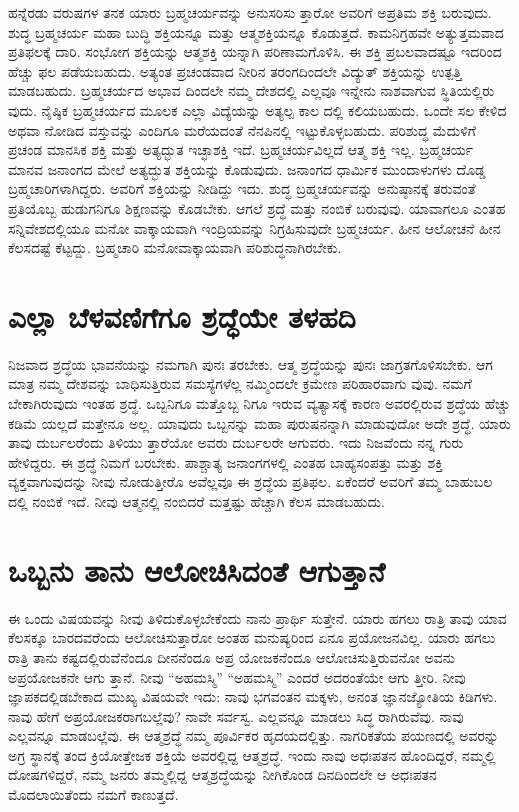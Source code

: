 ಹನ್ನೆರಡು ವರುಷಗಳ ತನಕ ಯಾರು ಬ್ರಹ್ಮಚರ್ಯವನ್ನು ಅನುಸರಿಸು ತ್ತಾರೋ ಅವರಿಗೆ ಅಪ್ರತಿಮ ಶಕ್ತಿ ಬರುವುದು. ಶುದ್ಧ ಬ್ರಹ್ಮಚರ್ಯ ಮಹಾ ಬುದ್ಧಿ ಶಕ್ತಿಯನ್ನೂ ಮತ್ತು ಆತ್ಮಶಕ್ತಿಯನ್ನೂ ಕೊಡುತ್ತದೆ. ಕಾಮನಿಗ್ರಹವೇ ಅತ್ಯುತ್ತಮವಾದ ಪ್ರತಿಫಲಕ್ಕೆ ದಾರಿ. ಸಂಭೋಗ ಶಕ್ತಿಯನ್ನು ಆತ್ಮಶಕ್ತಿ ಯನ್ನಾಗಿ ಪರಿಣಾಮಗೊಳಿಸಿ. ಈ ಶಕ್ತಿ ಪ್ರಬಲವಾದಷ್ಟೂ ಇದರಿಂದ ಹೆಚ್ಚು ಫಲ ಪಡೆಯಬಹುದು. ಅತ್ಯಂತ ಪ್ರಚಂಡವಾದ ನೀರಿನ ತರಂಗದಿಂದಲೇ ವಿದ್ಯುತ್ ಶಕ್ತಿಯನ್ನು ಉತ್ಪತ್ತಿ ಮಾಡಬಹುದು. ಬ್ರಹ್ಮಚರ್ಯದ ಅಭಾವ ದಿಂದಲೇ ನಮ್ಮ ದೇಶದಲ್ಲಿ ಎಲ್ಲವೂ ಇನ್ನೇನು ನಾಶವಾಗುವ ಸ್ಥಿತಿಯಲ್ಲಿರು ವುದು. ನೈಷ್ಠಿಕ ಬ್ರಹ್ಮಚರ್ಯದ ಮೂಲಕ ಎಲ್ಲಾ ವಿದ್ಯೆಯನ್ನು ಅತ್ಯಲ್ಪ ಕಾಲ ದಲ್ಲಿ ಕಲಿಯಬಹುದು. ಒಂದೇ ಸಲ ಕೇಳಿದ ಅಥವಾ ನೋಡಿದ ವಸ್ತುವನ್ನು ಎಂದಿಗೂ ಮರೆಯದಂತೆ ನೆನಪಿನಲ್ಲಿ ಇಟ್ಟುಕೊಳ್ಳಬಹುದು. ಪರಿಶುದ್ಧ ಮೆದುಳಿಗೆ ಪ್ರಚಂಡ ಮಾನಸಿಕ ಶಕ್ತಿ ಮತ್ತು ಅತ್ಯದ್ಭುತ ಇಚ್ಛಾಶಕ್ತಿ ಇದೆ. ಬ್ರಹ್ಮಚರ್ಯವಿಲ್ಲದೆ ಆತ್ಮ ಶಕ್ತಿ ಇಲ್ಲ. ಬ್ರಹ್ಮಚರ್ಯ ಮಾನವ ಜನಾಂಗದ ಮೇಲೆ ಅತ್ಯದ್ಭುತ ಶಕ್ತಿಯನ್ನು ಕೊಡುವುದು. ಜನಾಂಗದ ಧಾರ್ಮಿಕ ಮುಂದಾಳುಗಳು ದೊಡ್ಡ ಬ್ರಹ್ಮಚಾರಿಗಳಾಗಿದ್ದರು. ಅವರಿಗೆ ಶಕ್ತಿಯನ್ನು ನೀಡಿದ್ದು ಇದು. ಶುದ್ಧ ಬ್ರಹ್ಮಚರ್ಯವನ್ನು ಅನುಷ್ಠಾನಕ್ಕೆ ತರುವಂತೆ ಪ್ರತಿಯೊಬ್ಬ ಹುಡುಗನಿಗೂ ಶಿಕ್ಷಣವನ್ನು ಕೊಡಬೇಕು. ಆಗಲೆ ಶ್ರದ್ಧೆ ಮತ್ತು ನಂಬಿಕೆ ಬರುವುವು. ಯಾವಾಗಲೂ ಎಂತಹ ಸನ್ನಿವೇಶದಲ್ಲಿಯೂ ಮನೋ ವಾಕ್ಕಾಯವಾಗಿ ಇಂದ್ರಿಯವನ್ನು ನಿಗ್ರಹಿಸುವುದೇ ಬ್ರಹ್ಮಚರ್ಯ. ಹೀನ ಆಲೋಚನೆ ಹೀನ ಕೆಲಸದಷ್ಟೆ ಕೆಟ್ಟದ್ದು. ಬ್ರಹ್ಮಚಾರಿ ಮನೋವಾಕ್ಕಾಯವಾಗಿ ಪರಿಶುದ್ಧನಾಗಿರಬೇಕು.


\section{ಎಲ್ಲಾ ಬೆಳವಣಿಗೆಗೂ ಶ್ರದ್ಧೆಯೇ ತಳಹದಿ}

ನಿಜವಾದ ಶ್ರದ್ಧೆಯ ಭಾವನೆಯನ್ನು ನಮಗಾಗಿ ಪುನಃ ತರಬೇಕು. ಆತ್ಮ ಶ್ರದ್ಧೆಯನ್ನು ಪುನಃ ಜಾಗ್ರತಗೊಳಿಸಬೇಕು. ಆಗ ಮಾತ್ರ ನಮ್ಮ ದೇಶವನ್ನು ಬಾಧಿಸುತ್ತಿರುವ ಸಮಸ್ಯೆಗಳೆಲ್ಲ ನಮ್ಮಿಂದಲೇ ಕ್ರಮೇಣ ಪರಿಹಾರವಾಗು ವುವು. ನಮಗೆ ಬೇಕಾಗಿರುವುದು ಇಂತಹ ಶ್ರದ್ಧೆ. ಒಬ್ಬನಿಗೂ ಮತ್ತೊಬ್ಬ ನಿಗೂ ಇರುವ ವ್ಯತ್ಯಾಸಕ್ಕೆ ಕಾರಣ ಅವರಲ್ಲಿರುವ ಶ್ರದ್ಧೆಯ ಹೆಚ್ಚು ಕಡಿಮೆ ಯಲ್ಲದೆ ಮತ್ತೇನೂ ಅಲ್ಲ. ಯಾವುದು ಒಬ್ಬನನ್ನು ಮಹಾ ಪುರುಷನನ್ನಾಗಿ ಮಾಡುವುದೋ ಅದೇ ಶ್ರದ್ಧೆ. ಯಾರು ತಾವು ದುರ್ಬಲರೆಂದು ತಿಳಿಯು ತ್ತಾರೆಯೋ ಅವರು ದುರ್ಬಲರೇ ಆಗುವರು. ಇದು ನಿಜವೆಂದು ನನ್ನ ಗುರು ಹೇಳಿದ್ದರು. ಈ ಶ್ರದ್ಧೆ ನಿಮಗೆ ಬರಬೇಕು. ಪಾಶ್ಚಾತ್ಯ ಜನಾಂಗಗಳಲ್ಲಿ ಎಂತಹ ಬಾಹ್ಯಸಂಪತ್ತು ಮತ್ತು ಶಕ್ತಿ ವ್ಯಕ್ತವಾಗುವುದನ್ನು ನೀವು ನೋಡುತ್ತೀರೊ ಅವೆಲ್ಲವೂ ಈ ಶ್ರದ್ಧೆಯ ಪ್ರತಿಫಲ. ಏಕೆಂದರೆ ಅವರಿಗೆ ತಮ್ಮ ಬಾಹುಬಲ ದಲ್ಲಿ ನಂಬಿಕೆ ಇದೆ. ನೀವು ಆತ್ಮನಲ್ಲಿ ನಂಬಿದರೆ ಮತ್ತಷ್ಟು ಹೆಚ್ಚಾಗಿ ಕೆಲಸ ಮಾಡಬಹುದು.


\section{ಒಬ್ಬನು ತಾನು ಆಲೋಚಿಸಿದಂತೆ ಆಗುತ್ತಾನೆ}

ಈ ಒಂದು ವಿಷಯವನ್ನು ನೀವು ತಿಳಿದುಕೊಳ್ಳಬೇಕೆಂದು ನಾನು ಪ್ರಾರ್ಥಿ ಸುತ್ತೇನೆ. ಯಾರು ಹಗಲು ರಾತ್ರಿ ತಾವು ಯಾವ ಕೆಲಸಕ್ಕೂ ಬಾರದವರೆಂದು ಆಲೋಚಿಸುತ್ತಾರೋ ಅಂತಹ ಮನುಷ್ಯರಿಂದ ಏನೂ ಪ್ರಯೋಜನವಿಲ್ಲ. ಯಾರು ಹಗಲು ರಾತ್ರಿ ತಾನು ಕಷ್ಟದಲ್ಲಿರುವೆನೆಂದೂ ದೀನನೆಂದೂ ಅಪ್ರ ಯೋಜಕನೆಂದೂ ಆಲೋಚಿಸುತ್ತಿರುವನೋ ಅವನು ಅಪ್ರಯೋಜಕನೇ ಆಗು ತ್ತಾನೆ. ನೀವು “ಅಹಮಸ್ಮಿ” “ಅಹಮಸ್ಮಿ” ಎಂದರೆ ಅದರಂತೆಯೇ ಆಗು ತ್ತೀರಿ. ನೀವು ಜ್ಞಾಪಕದಲ್ಲಿಡಬೇಕಾದ ಮುಖ್ಯ ವಿಷಯವೇ ಇದು: ನಾವು ಭಗವಂತನ ಮಕ್ಕಳು, ಅನಂತ ಜ್ಞಾನಜ್ಯೋತಿಯ ಕಿಡಿಗಳು. ನಾವು ಹೇಗೆ ಅಪ್ರಯೋಜಕರಾಗಬಲ್ಲೆವು? ನಾವೇ ಸರ್ವಸ್ವ. ಎಲ್ಲವನ್ನೂ ಮಾಡಲು ಸಿದ್ಧ ರಾಗಿರುವೆವು. ನಾವು ಎಲ್ಲವನ್ನೂ ಮಾಡಬಲ್ಲೆವು. ಈ ಆತ್ಮಶ್ರದ್ಧೆ ನಮ್ಮ ಪೂರ್ವಿಕರ ಹೃದಯದಲ್ಲಿತ್ತು. ನಾಗರಿಕತೆಯ ಪಯಣದಲ್ಲಿ ಅವರನ್ನು ಅಗ್ರ ಸ್ಥಾನಕ್ಕೆ ತಂದ ಕ್ರಿಯೋತ್ತೇಜಕ ಶಕ್ತಿಯೆ ಅವರಲ್ಲಿದ್ದ ಆತ್ಮಶ್ರದ್ಧೆ. ಇಂದು ನಾವು ಅಧಃಪತನ ಹೊಂದಿದ್ದರೆ, ನಮ್ಮಲ್ಲಿ ದೋಷಗಳಿದ್ದರೆ, ನಮ್ಮ ಜನರು ತಮ್ಮಲ್ಲಿದ್ದ ಆತ್ಮಶ್ರದ್ಧೆಯನ್ನು ನೀಗಿಕೊಂಡ ದಿನದಿಂದಲೇ ಆ ಅಧಃಪತನ ಮೊದಲಾಯಿತೆಂದು ನಮಗೆ ಕಾಣುತ್ತದೆ.

